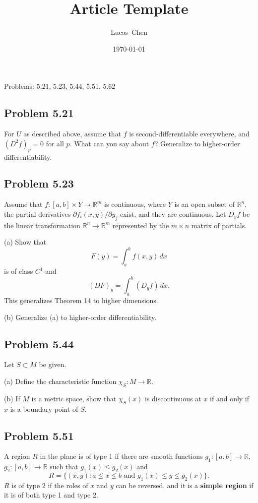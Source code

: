 \documentclass{amsart}
\title{Article Template}
\author{Lucas\ Chen}
\date{\today}
\begin{document}
\maketitle

Problems: 5.21, 5.23, 5.44, 5.51, 5.62

\subsection*{Problem 5.21} For \( U \) as described above, assume that \( f \) is second-differentiable everywhere, and \( (D^2 f)_p = 0 \) for all \( p \). What can you say about \( f \)? Generalize to higher-order differentiability.

\medskip \noindent 

\newpage

\subsection*{Problem 5.23} Assume that \( f : [a, b] \times Y \to \mathbb{R}^m \) is continuous, where \( Y \) is an open subset of \( \mathbb{R}^n \), the partial derivatives \( \partial f_i(x, y) / \partial y_j \) exist, and they are continuous. Let \( D_y f \) be the linear transformation \( \mathbb{R}^n \to \mathbb{R}^m \) represented by the \( m \times n \) matrix of partials.

(a) Show that
    \[
    F(y) = \int_a^b f(x, y) \, dx
    \]
    is of class \( C^1 \) and
    \[
    (DF)_y = \int_a^b (D_y f) \, dx.
    \]
    This generalizes Theorem 14 to higher dimensions.

(b) Generalize (a) to higher-order differentiability.

\medskip \noindent

\newpage

\subsection*{Problem 5.44} Let \( S \subset M \) be given.

(a) Define the characteristic function \( \chi_S : M \to \mathbb{R} \).

(b) If \( M \) is a metric space, show that \( \chi_S(x) \) is discontinuous at \( x \) if and only if \( x \) is a boundary point of \( S \).

\medskip \noindent

\newpage

\subsection*{Problem 5.51} A region \( R \) in the plane is of type 1 if there are smooth functions \( g_1 : [a, b] \to \mathbb{R} \), \( g_2 : [a, b] \to \mathbb{R} \) such that \( g_1(x) \leq g_2(x) \) and
\[
R = \{(x, y) : a \leq x \leq b \text{ and } g_1(x) \leq y \leq g_2(x)\}.
\]
\( R \) is of type 2 if the roles of \( x \) and \( y \) can be reversed, and it is a \textbf{simple region} if it is of both type 1 and type 2.
\end{document}
